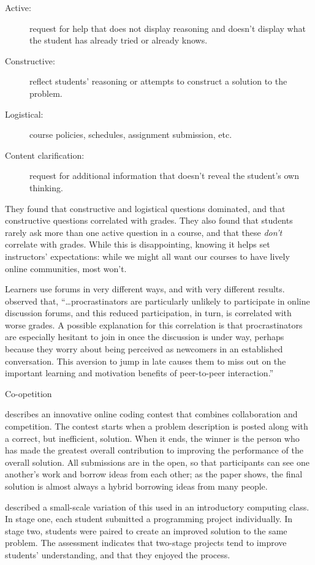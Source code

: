 \begin{description}

\item[Active:] request for help that does not display reasoning and
  doesn't display what the student has already tried or already knows.

\item[Constructive:] reflect students' reasoning or attempts to
  construct a solution to the problem.

\item[Logistical:] course policies, schedules, assignment submission,
  etc.

\item[Content clarification:] request for additional information that
  doesn't reveal the student's own thinking.

\end{description}

They found that constructive and logistical questions dominated, and
that constructive questions correlated with grades.  They also found
that students rarely ask more than one active question in a course,
and that these \emph{don't} correlate with grades.  While this is
disappointing, knowing it helps set instructors' expectations: while
we might all want our courses to have lively online communities, most
won't.

Learners use forums in very different ways, and with very different
results. \cite{Mill2016a} observed that, ``{\ldots}procrastinators are
particularly unlikely to participate in online discussion forums, and
this reduced participation, in turn, is correlated with worse
grades. A possible explanation for this correlation is that
procrastinators are especially hesitant to join in once the discussion
is under way, perhaps because they worry about being perceived as
newcomers in an established conversation. This aversion to jump in
late causes them to miss out on the important learning and motivation
benefits of peer-to-peer interaction.''

\begin{callout}{Co-opetition}

  \cite{Gull2004} describes an innovative online coding contest that
  combines collaboration and competition.  The contest starts when a
  problem description is posted along with a correct, but inefficient,
  solution.  When it ends, the winner is the person who has made the
  greatest overall contribution to improving the performance of the
  overall solution. All submissions are in the open, so that
  participants can see one another's work and borrow ideas from each
  other; as the paper shows, the final solution is almost always a
  hybrid borrowing ideas from many people.

  \cite{Batt2018} described a small-scale variation of this used in an
  introductory computing class.  In stage one, each student submitted
  a programming project individually.  In stage two, students were
  paired to create an improved solution to the same problem.  The
  assessment indicates that two-stage projects tend to improve
  students' understanding, and that they enjoyed the process.

\end{callout}

